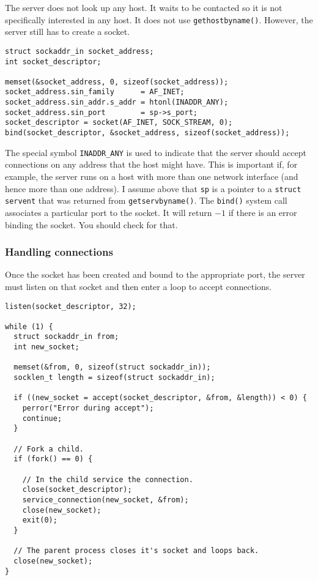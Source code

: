 \documentclass{article}
\begin{document}
The server does not look up any host. It waits to be contacted so it is not specifically interested in any host. It does not use \texttt{gethostbyname()}. However, the server still has to create a socket.

\begin{verbatim}
struct sockaddr_in socket_address;
int socket_descriptor;

memset(&socket_address, 0, sizeof(socket_address));
socket_address.sin_family      = AF_INET;
socket_address.sin_addr.s_addr = htonl(INADDR_ANY);
socket_address.sin_port        = sp->s_port;
socket_descriptor = socket(AF_INET, SOCK_STREAM, 0);
bind(socket_descriptor, &socket_address, sizeof(socket_address));
\end{verbatim}

The special symbol \texttt{INADDR\_ANY} is used to indicate that the server should accept connections on any address that the host might have. This is important if, for example, the server runs on a host with more than one network interface (and hence more than one address). I assume above that \texttt{sp} is a pointer to a \texttt{struct servent} that was returned from \texttt{getservbyname()}. The \texttt{bind()} system call associates a particular port to the socket. It will return $-1$ if there is an error binding the socket. You should check for that.

\subsubsection{Handling connections}

Once the socket has been created and bound to the appropriate port, the server must listen on that socket and then enter a loop to accept connections.

\begin{verbatim}
listen(socket_descriptor, 32);

while (1) {
  struct sockaddr_in from;
  int new_socket;
  
  memset(&from, 0, sizeof(struct sockaddr_in));
  socklen_t length = sizeof(struct sockaddr_in);

  if ((new_socket = accept(socket_descriptor, &from, &length)) < 0) {
    perror("Error during accept");
    continue;
  }
  
  // Fork a child.
  if (fork() == 0) {

    // In the child service the connection.
    close(socket_descriptor);
    service_connection(new_socket, &from);
    close(new_socket);
    exit(0);
  }

  // The parent process closes it's socket and loops back.
  close(new_socket);
}
\end{verbatim}
\end{document}
